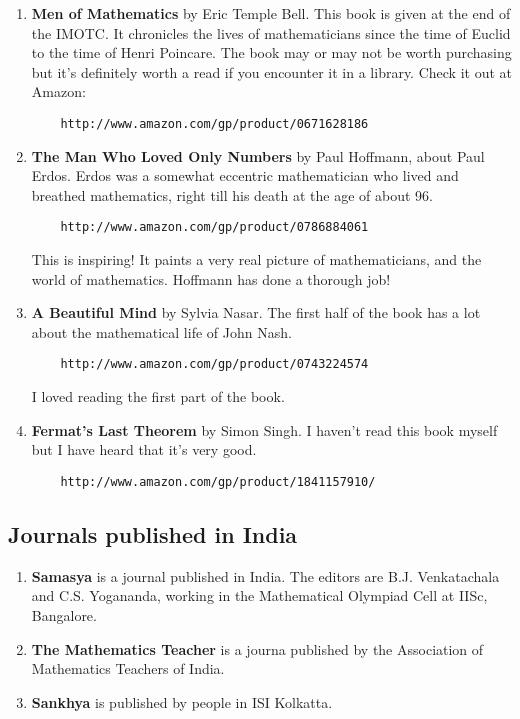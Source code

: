 \documentclass[a4paper]{amsart}
\begin{document}
\begin{enumerate}

\item {\bf Men of Mathematics} by Eric Temple Bell. This book is given at the end of the IMOTC. It chronicles the lives
  of mathematicians since the time of Euclid to the time of Henri Poincare. The book may or may not be worth
  purchasing but it's definitely worth a read if you encounter it in a library. Check it out at Amazon:

  \begin{verbatim}
    http://www.amazon.com/gp/product/0671628186
  \end{verbatim}
\item {\bf The Man Who Loved Only Numbers} by Paul Hoffmann, about Paul Erdos. Erdos was a somewhat eccentric mathematician who lived
  and breathed mathematics, right till his death at the age of about 96.
  \begin{verbatim}
    http://www.amazon.com/gp/product/0786884061
  \end{verbatim}

  This is inspiring! It paints a very real picture of mathematicians, and the world of mathematics. Hoffmann has done a thorough
  job!
\item {\bf A Beautiful Mind} by Sylvia Nasar. The first half of the book has a lot about the mathematical life of John Nash.
  \begin{verbatim}
    http://www.amazon.com/gp/product/0743224574
  \end{verbatim}

  I loved reading the first part of the book.
\item {\bf Fermat's Last Theorem} by Simon Singh. I haven't read this book myself but I have heard that it's very good.

  \begin{verbatim}
    http://www.amazon.com/gp/product/1841157910/
  \end{verbatim}

\end{enumerate}

\subsection{Journals published in India}

\begin{enumerate}

\item {\bf Samasya} is a journal published in India. The editors are B.J. Venkatachala and C.S. Yogananda, working in
  the Mathematical Olympiad Cell at IISc, Bangalore.

\item {\bf The Mathematics Teacher} is a journa published by the Association of Mathematics Teachers of India.

\item {\bf Sankhya} is published by people in ISI Kolkatta.
\end{enumerate}
\end{document}
